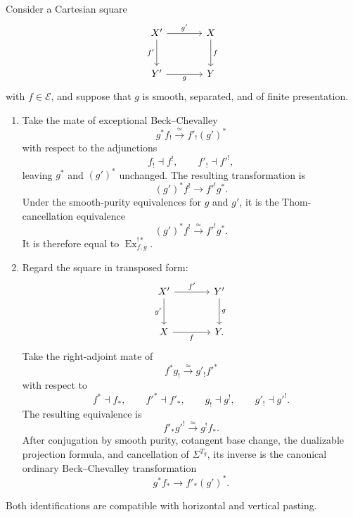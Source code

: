 \begin{lemma}
\label{lem:purity-beck-chevalley-mates}
Consider a Cartesian square
\[
\begin{tikzcd}[column sep=large,row sep=large]
    X' \arrow[r,"g'"] \arrow[d,"f'"']
        & X \arrow[d,"f"] \\
    Y' \arrow[r,"g"']
        & Y
\end{tikzcd}
\]
with \(f\in\mathcal E\), and suppose that \(g\) is smooth, separated, and
of finite presentation.

\begin{enumerate}
    \item Take the mate of exceptional Beck--Chevalley
    \[
        g^*f_!
        \xrightarrow{\simeq}
        f'_!(g')^*
    \]
    with respect to the adjunctions
    \[
        f_!\dashv f^!,
        \qquad
        f'_!\dashv f'^!,
    \]
    leaving \(g^*\) and \((g')^*\) unchanged.  The resulting transformation
    is
    \[
        (g')^*f^!
        \longrightarrow
        f'^!g^*.
    \]
    Under the smooth-purity equivalences for \(g\) and \(g'\), it is the
    Thom-cancellation equivalence
    \[
        (g')^*f^!
        \xrightarrow{\simeq}
        f'^!g^*.
    \]
    It is therefore equal to
    \(\operatorname{Ex}^{!*}_{f,g}\).

    \item Regard the square in transposed form:
    \[
    \begin{tikzcd}[column sep=large,row sep=large]
        X' \arrow[r,"f'"] \arrow[d,"g'"']
            & Y' \arrow[d,"g"] \\
        X \arrow[r,"f"']
            & Y.
    \end{tikzcd}
    \]
    Take the right-adjoint mate of
    \[
        f^*g_!
        \xrightarrow{\simeq}
        g'_!f'^*
    \]
    with respect to
    \[
        f^*\dashv f_*,
        \qquad
        f'^*\dashv f'_*,
        \qquad
        g_!\dashv g^!,
        \qquad
        g'_!\dashv g'^!.
    \]
    The resulting equivalence is
    \[
        f'_*g'^!
        \xrightarrow{\simeq}
        g^!f_*.
    \]
    After conjugation by smooth purity, cotangent base change, the
    dualizable projection formula, and cancellation of
    \(\Sigma^{T_g}\), its inverse is the canonical ordinary
    Beck--Chevalley transformation
    \[
        g^*f_*
        \longrightarrow
        f'_*(g')^*.
    \]
\end{enumerate}

Both identifications are compatible with horizontal and vertical pasting.
\end{lemma}

